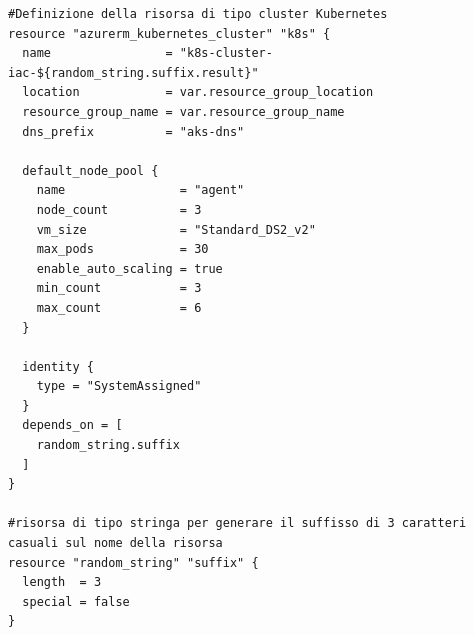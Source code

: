\documentclass[a4paper,12pt]{report}
\begin{document}
\begin{lstlisting}[caption={\\\textit{Codice sorgente all'interno del file main.tf.\\ }}]
#Definizione della risorsa di tipo cluster Kubernetes
resource "azurerm_kubernetes_cluster" "k8s" {
  name                = "k8s-cluster-iac-${random_string.suffix.result}"
  location            = var.resource_group_location
  resource_group_name = var.resource_group_name
  dns_prefix          = "aks-dns"

  default_node_pool {
    name                = "agent"
    node_count          = 3
    vm_size             = "Standard_DS2_v2"
    max_pods            = 30
    enable_auto_scaling = true
    min_count           = 3
    max_count           = 6
  }

  identity {
    type = "SystemAssigned"
  }
  depends_on = [
    random_string.suffix
  ]
}

#risorsa di tipo stringa per generare il suffisso di 3 caratteri casuali sul nome della risorsa
resource "random_string" "suffix" {
  length  = 3
  special = false
}
\end{lstlisting}
\end{document}
